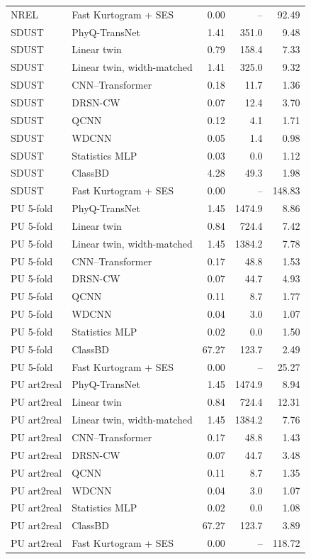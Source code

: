 \begin{tabular}{llrrr}
NREL & Fast Kurtogram + SES & 0.00 & -- & 92.49 \\
SDUST & PhyQ-TransNet & 1.41 & 351.0 & 9.48 \\
SDUST & Linear twin & 0.79 & 158.4 & 7.33 \\
SDUST & Linear twin, width-matched & 1.41 & 325.0 & 9.32 \\
SDUST & CNN--Transformer & 0.18 & 11.7 & 1.36 \\
SDUST & DRSN-CW & 0.07 & 12.4 & 3.70 \\
SDUST & QCNN & 0.12 & 4.1 & 1.71 \\
SDUST & WDCNN & 0.05 & 1.4 & 0.98 \\
SDUST & Statistics MLP & 0.03 & 0.0 & 1.12 \\
SDUST & ClassBD & 4.28 & 49.3 & 1.98 \\
SDUST & Fast Kurtogram + SES & 0.00 & -- & 148.83 \\
PU 5-fold & PhyQ-TransNet & 1.45 & 1474.9 & 8.86 \\
PU 5-fold & Linear twin & 0.84 & 724.4 & 7.42 \\
PU 5-fold & Linear twin, width-matched & 1.45 & 1384.2 & 7.78 \\
PU 5-fold & CNN--Transformer & 0.17 & 48.8 & 1.53 \\
PU 5-fold & DRSN-CW & 0.07 & 44.7 & 4.93 \\
PU 5-fold & QCNN & 0.11 & 8.7 & 1.77 \\
PU 5-fold & WDCNN & 0.04 & 3.0 & 1.07 \\
PU 5-fold & Statistics MLP & 0.02 & 0.0 & 1.50 \\
PU 5-fold & ClassBD & 67.27 & 123.7 & 2.49 \\
PU 5-fold & Fast Kurtogram + SES & 0.00 & -- & 25.27 \\
PU art2real & PhyQ-TransNet & 1.45 & 1474.9 & 8.94 \\
PU art2real & Linear twin & 0.84 & 724.4 & 12.31 \\
PU art2real & Linear twin, width-matched & 1.45 & 1384.2 & 7.76 \\
PU art2real & CNN--Transformer & 0.17 & 48.8 & 1.43 \\
PU art2real & DRSN-CW & 0.07 & 44.7 & 3.48 \\
PU art2real & QCNN & 0.11 & 8.7 & 1.35 \\
PU art2real & WDCNN & 0.04 & 3.0 & 1.07 \\
PU art2real & Statistics MLP & 0.02 & 0.0 & 1.08 \\
PU art2real & ClassBD & 67.27 & 123.7 & 3.89 \\
PU art2real & Fast Kurtogram + SES & 0.00 & -- & 118.72 \\
\bottomrule
\end{tabular}